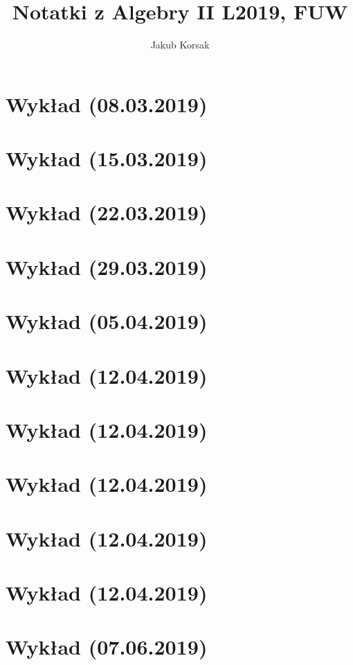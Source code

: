 \documentclass{article}
\title{Notatki z Algebry II L2019, FUW}
\author{Jakub Korsak}
\begin{document}
\maketitle

\pagebreak
\section{Wykład (08.03.2019)}

\pagebreak
\section{Wykład (15.03.2019)}

\pagebreak
\section{Wykład (22.03.2019)}

\pagebreak
\section{Wykład (29.03.2019)}

\pagebreak
\section{Wykład (05.04.2019)}

\pagebreak
\section{Wykład (12.04.2019)}

\pagebreak
\section{Wykład (12.04.2019)}

\pagebreak
\section{Wykład (12.04.2019)}

\pagebreak
\section{Wykład (12.04.2019)}

\pagebreak
%   
\section{Wykład (12.04.2019)}

\pagebreak
\section{Wykład (07.06.2019)}

\end{document}

